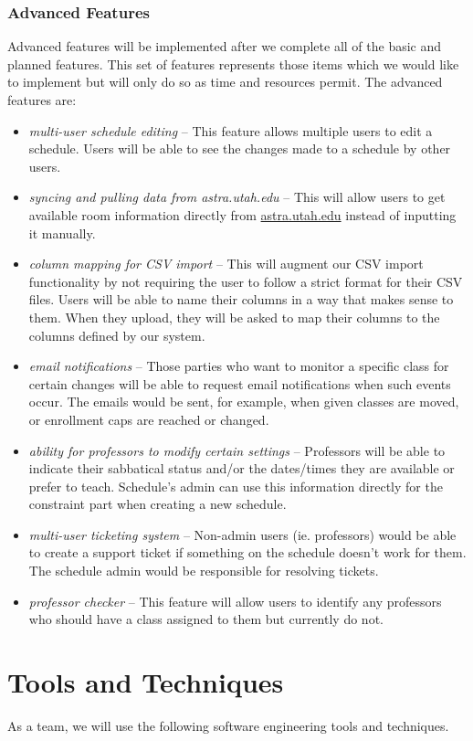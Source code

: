 \documentclass{extarticle}
\begin{document}
\subsubsection{Advanced Features}
Advanced features will be implemented after we complete all of the basic and planned features.  This set of features
represents those items which we would like to implement but will only do so as time and resources permit.  The
advanced features are:
\begin{itemize}
\item \emph{multi-user schedule editing} -- This feature allows multiple users to edit a schedule. Users will be able to
see the changes made to a schedule by other users.
\item \emph{syncing and pulling data from astra.utah.edu} -- This will allow users to get available room information
directly from \url{astra.utah.edu} instead of inputting it manually.
\item \emph{column mapping for CSV import} -- This will augment our CSV import functionality by not requiring the
user to follow a strict format for their CSV files.  Users will be able to name their columns in a way that makes
sense to them. When they upload, they will be asked to map their columns to the columns defined by our system.
\item \emph{email notifications} -- Those parties who want to monitor a specific class for certain changes will be
able to request email notifications when such events occur.  The emails would be sent, for example, when given
classes are moved, or enrollment caps are reached or changed.
\item \emph{ability for professors to modify certain settings} -- Professors will be able to indicate their sabbatical
status and/or the dates/times they are available or prefer to teach. Schedule's admin can use this information directly
for the constraint part when creating a new schedule.
\item \emph{multi-user ticketing system} -- Non-admin users (ie. professors) would be able to create a support
ticket if something on the schedule doesn't work for them. The schedule admin would be responsible for resolving tickets.
\item \emph{professor checker} -- This feature will allow users to identify any professors who should have a class
assigned to them but currently do not.
\end{itemize}

\section{Tools and Techniques}
As a team, we will use the following software engineering tools and techniques.
\end{document}
